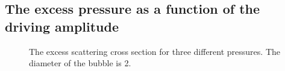 

%     




\subsection{The excess pressure as a function of the driving amplitude}\label{sec:phase_amp}



 \begin{figure}
   \centering
   \hspace*{-0.2cm}
    \caption{
      The excess scattering cross section for three different pressures.
      The diameter of the bubble is \unit{2}\micro\metre.
   }
   \label{fig:excess_intensity:amp:compare}
 \end{figure}


